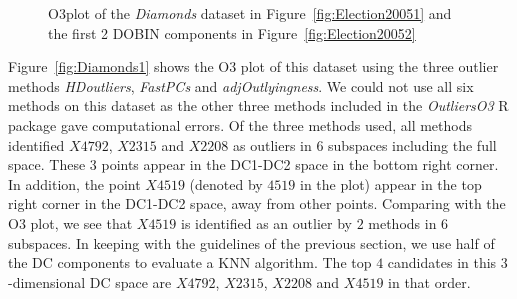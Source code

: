 \documentclass[11pt]{article}
\begin{document}
\begin{figure}[!ht]
	\centering
	\caption{O3plot of the \textit{Diamonds} dataset in Figure~\ref{fig:Election20051} and the first 2 DOBIN components in Figure~\ref{fig:Election20052} }
	\label{fig:Diamonds}
\end{figure}

Figure~\ref{fig:Diamonds1} shows the O3 plot of this dataset using the three outlier methods \textit{HDoutliers}, \textit{FastPCs} and \textit{adjOutlyingness}. We could not use all six methods on this dataset as the other three methods included in the \textit{OutliersO3} R package gave computational errors. Of the three methods used, all methods identified $X4792$, $X2315$ and $X2208$ as outliers in 6 subspaces including the full space. These $3$ points appear in the DC1-DC2 space in the bottom right corner. In addition, the point $X4519$ (denoted by $4519$ in the plot) appear in the top right corner in the DC1-DC2 space, away from other points. Comparing with the O3 plot, we see that $X4519$ is identified as an outlier by $2$ methods in $6$ subspaces. In keeping with the guidelines of the previous section, we use half of the DC components to evaluate a KNN algorithm. The top $4$ candidates in this $3$-dimensional DC space are $X4792$, $X2315$, $X2208$ and $X4519$ in that order. \\
\end{document}
